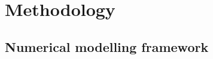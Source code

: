 \documentclass[12pt]{article}
\begin{document}



\section{Methodology}

\subsection{Numerical modelling framework}
\end{document}
